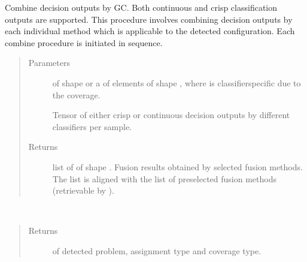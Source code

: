 \documentclass[letterpaper,10pt,english]{sphinxmanual}
\begin{document}
\begin{fulllineitems}
\begin{fulllineitems}
\label{\detokenize{pusion.auto.generic_combiner:pusion.auto.generic_combiner.GenericCombiner.combine_seq}}
\sphinxAtStartPar
Combine decision outputs by GC. Both continuous and crisp classification outputs are supported.
This procedure involves combining decision outputs by each individual method which is applicable
to the detected configuration. Each combine procedure is initiated in sequence.
\begin{quote}\begin{description}
\item[{Parameters}] \leavevmode
\sphinxAtStartPar
{} \textendash{} 
\sphinxAtStartPar
{} of shape  or a  of
 elements of shape , where  is classifier\sphinxhyphen{}specific
due to the coverage.

\sphinxAtStartPar
Tensor of either crisp or continuous decision outputs by different classifiers per sample.


\item[{Returns}] \leavevmode
\sphinxAtStartPar
list of  of shape .
Fusion results obtained by selected fusion methods.
The list is aligned with the list of preselected fusion methods (retrievable by ).

\end{description}\end{quote}

\end{fulllineitems}


\begin{fulllineitems}
\label{\detokenize{pusion.auto.generic_combiner:pusion.auto.generic_combiner.GenericCombiner.get_pac}}~\begin{quote}\begin{description}
\item[{Returns}] \leavevmode
\sphinxAtStartPar
{} of detected problem, assignment type and coverage type.


\end{description}
\end{quote}
\end{fulllineitems}
\end{fulllineitems}
\end{document}
